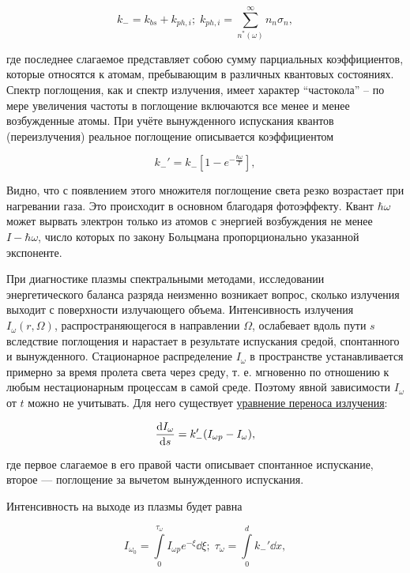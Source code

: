 \documentclass[10pt, a4paper]{article}
\begin{document}
\begin{equation*}
	k_{-} = k_{bs}+k_{ph,i};\;k_{ph,i} = \sum\limits_{n^{*}(\omega)}^\infty n_n\sigma_n,
\end{equation*}

где последнее слагаемое представляет собою сумму парциальных коэффициентов, которые относятся к атомам, пребывающим в различных квантовых состояниях. Спектр поглощения, как и спектр излучения, имеет характер ``частокола'' -- по мере увеличения частоты в поглощение включаются все менее и менее возбужденные атомы. При учёте вынужденного испускания квантов (переизлучения) реальное поглощение описывается коэффициентом

\begin{equation*}
	k_{-}' = k_{-}\left[1-e^{-\frac{\hbar\omega}{T}}\right] ,
\end{equation*}

Видно, что с появлением этого множителя поглощение света резко возрастает при нагревании газа. Это происходит в основном благодаря фотоэффекту. Квант $\hbar\omega$ может вырвать электрон только из атомов с энергией возбуждения не менее $I-\hbar\omega$, число которых по закону Больцмана пропорционально указанной
экспоненте.

При диагностике плазмы спектральными методами, исследовании энергетического баланса разряда неизменно возникает вопрос, сколько излучения выходит с поверхности излучающего объема. Интенсивность излучения $I_\omega(r, \Omega)$, распространяющегося в направлении $\Omega$, ослабевает вдоль пути $s$ вследствие поглощения и нарастает в результате испускания средой, спонтанного и вынужденного. Стационарное распределение $I_\omega$ в пространстве устанавливается примерно за время пролета света через среду, т. е. мгновенно по отношению к любым нестационарным процессам в самой среде. Поэтому явной зависимости $I_\omega$ от $t$ можно не учитывать. Для него существует \uline{уравнение переноса излучения}:

\begin{equation*}
	\dv{I_\omega}{s} = k_{-}'(I_{\omega p}-I_\omega),
\end{equation*}

где первое слагаемое в его правой части описывает спонтанное испускание, второе — поглощение за вычетом вынужденного испускания.

Интенсивность на выходе из плазмы будет равна~\cite{raizer}

\begin{equation*}
	I_{\omega_0} = \int\limits_0^{\tau_\omega} I_{\omega p}e^{-\xi}\dd{\xi}; \; \tau_\omega = \int\limits_0^dk_{-}'\dd{x},
\end{equation*}
\end{document}
